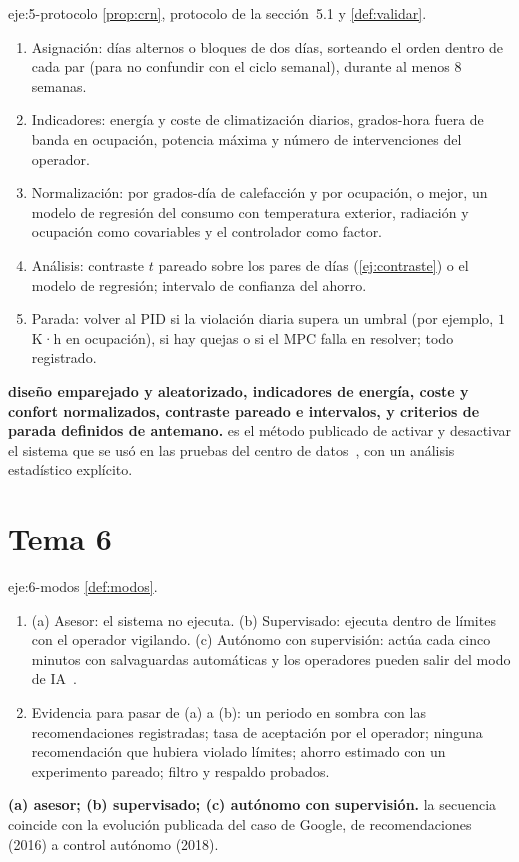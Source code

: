 \begin{solucion}{eje:5-protocolo}
\planteamiento \cref{prop:crn}, protocolo de la sección~5.1 y \cref{def:validar}.
\pasos
\begin{enumerate}[label=\arabic*.]
  \item Asignación: días alternos o bloques de dos días, sorteando el orden dentro de cada par (para no confundir con el ciclo semanal), durante al menos 8 semanas.
  \item Indicadores: energía y coste de climatización diarios, grados-hora fuera de banda en ocupación, potencia máxima y número de intervenciones del operador.
  \item Normalización: por grados-día de calefacción y por ocupación, o mejor, un modelo de regresión del consumo con temperatura exterior, radiación y ocupación como covariables y el controlador como factor.
  \item Análisis: contraste $t$ pareado sobre los pares de días (\cref{ej:contraste}) o el modelo de regresión; intervalo de confianza del ahorro.
  \item Parada: volver al PID si la violación diaria supera un umbral (por ejemplo, $1$ K·h en ocupación), si hay quejas o si el MPC falla en resolver; todo registrado.
\end{enumerate}
\resultado \textbf{diseño emparejado y aleatorizado, indicadores de energía, coste y confort normalizados, contraste pareado e intervalos, y criterios de parada definidos de antemano.}
\comprobacion es el método publicado de activar y desactivar el sistema que se usó en las pruebas del centro de datos~\cite{evansgao}, con un análisis estadístico explícito.
\end{solucion}

\section{Tema 6}

\begin{solucion}{eje:6-modos}
\planteamiento \cref{def:modos}.
\pasos
\begin{enumerate}[label=\arabic*.]
  \item (a) Asesor: el sistema no ejecuta. (b) Supervisado: ejecuta dentro de límites con el operador vigilando. (c) Autónomo con supervisión: actúa cada cinco minutos con salvaguardas automáticas y los operadores pueden salir del modo de IA~\cite{gamblegao}.
  \item Evidencia para pasar de (a) a (b): un periodo en sombra con las recomendaciones registradas; tasa de aceptación por el operador; ninguna recomendación que hubiera violado límites; ahorro estimado con un experimento pareado; filtro y respaldo probados.
\end{enumerate}
\resultado \textbf{(a) asesor; (b) supervisado; (c) autónomo con supervisión.}
\comprobacion la secuencia coincide con la evolución publicada del caso de Google, de recomendaciones (2016) a control autónomo (2018).
\end{solucion}

